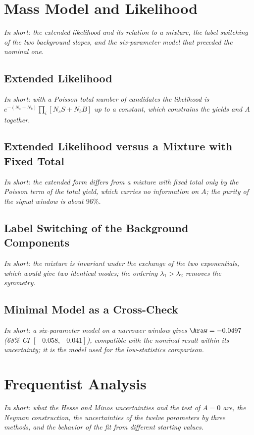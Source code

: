 \FloatBarrier

\section{Mass Model and Likelihood}
\label{app:model}
\emph{In short: the extended likelihood and its relation to a mixture, the label switching of the two background slopes, and the six-parameter model that preceded the nominal one.}
\subsection{Extended Likelihood}
\emph{In short: with a Poisson total number of candidates the likelihood is $e^{-(N_s+N_b)}\prod_i[N_s S+N_b B]$ up to a constant, which constrains the yields and $A$ together.}

\subsection{Extended Likelihood versus a Mixture with Fixed Total}
\emph{In short: the extended form differs from a mixture with fixed total only by the Poisson term of the total yield, which carries no information on $A$; the purity of the signal window is about $96\%$.}

\subsection{Label Switching of the Background Components}
\emph{In short: the mixture is invariant under the exchange of the two exponentials, which would give two identical modes; the ordering $\lambda_1>\lambda_2$ removes the symmetry.}

\subsection{Minimal Model as a Cross-Check}
\label{sec:bayes_minimal}
\emph{In short: a six-parameter model on a narrower window gives $\Araw=-0.0497$ (68\% CI $[-0.058,-0.041]$), compatible with the nominal result within its uncertainty; it is the model used for the low-statistics comparison.}

\FloatBarrier

\section{Frequentist Analysis}
\label{app:freq}
\emph{In short: what the Hesse and Minos uncertainties and the test of $A=0$ are, the Neyman construction, the uncertainties of the twelve parameters by three methods, and the behavior of the fit from different starting values.}
